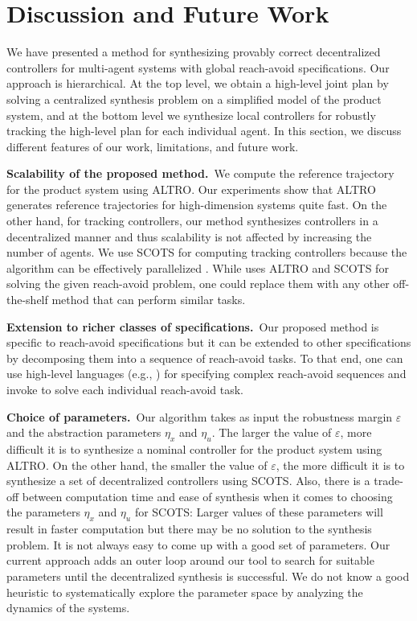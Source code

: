 \section{Discussion and Future Work}
We have presented a method for synthesizing provably correct decentralized controllers for multi-agent systems with global reach-avoid specifications. 
Our approach is hierarchical. 
At the top level, we obtain a high-level joint plan by solving a centralized synthesis problem on a simplified model of the product system, 
and at the bottom level we synthesize local controllers for robustly tracking the high-level plan for each individual agent.
In this section, we discuss different features of our work, limitations, and future work.

\smallskip
\noindent\textbf{Scalability of the proposed method.}\
We compute the reference trajectory for the product system using ALTRO. 
Our experiments show that ALTRO generates reference trajectories for high-dimension systems quite fast. 
On the other hand, for tracking controllers, our method synthesizes controllers in a decentralized manner and 
thus scalability is not affected by increasing the number of agents. 
We use SCOTS for computing tracking controllers because the algorithm can be effectively parallelized \cite{KhaledZ19pfaces}. 
While \tool uses ALTRO and SCOTS for solving the given reach-avoid problem, 
one could replace them with any other off-the-shelf method that can perform similar tasks.

\smallskip
\noindent\textbf{Extension to richer classes of specifications.}\
Our proposed method is specific to reach-avoid specifications but it can be extended to other specifications by 
decomposing them into a sequence of reach-avoid tasks. 
To that end, one can use high-level languages (e.g., \cite{Majumdar2020,Ghosh2020}) for specifying complex reach-avoid 
sequences and invoke \tool to solve each individual reach-avoid task.

\smallskip
\noindent\textbf{Choice of parameters.}\
Our algorithm takes as input the robustness margin $\varepsilon$ and the abstraction parameters $\eta_x$ and $\eta_u$.
The larger the value of $\varepsilon$, more difficult it is to synthesize a nominal controller for the product system using ALTRO.
On the other hand, the smaller the value of $\varepsilon$, the more difficult it is to synthesize a set of decentralized controllers using SCOTS.
Also, there is a trade-off between computation time and ease of synthesis when it comes to choosing the parameters $\eta_x$ and $\eta_u$ for SCOTS:
Larger values of these parameters will result in faster computation but there may be no solution to the synthesis problem.
It is not always easy to come up with a good set of parameters.
Our current approach adds an outer loop around our tool to search for suitable parameters until the decentralized synthesis is successful.
We do not know a good heuristic to systematically explore the parameter space by analyzing the dynamics of the systems.

